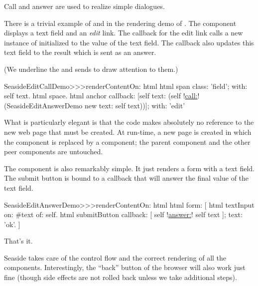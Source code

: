 \documentclass[a4paper,10pt,twoside]{book}
\begin{document}
Call and answer are used to realize simple dialogues.

There is a trivial example of  and  in the rendering demo of .
The component  displays a text field and an \emph{edit} link.
The callback for the edit link calls a new instance of  initialized to the value of the text field.
The callback also updates this text field to the result which is sent as an answer.

(We underline the  and  sends to draw attention to them.)

\begin{code}{}
SeasideEditCallDemo>>>renderContentOn: html 
	html span
		class: 'field';
		with: self text.
	html space.
	html anchor
		callback: [self text: (self !\underline{call:}! (SeasideEditAnswerDemo new text: self text))];
		with: 'edit'
\end{code}{}

What is particularly elegant is that the code makes absolutely no reference to the new web page that must be created.
At run-time, a new page is created in which the  component is replaced by a  component; the parent component and the other peer components are untouched.


The  component is also remarkably simple.
It just renders a form with a text field.
The submit button is bound to a callback that will answer the final value of the text field.

\begin{code}{}
SeasideEditAnswerDemo>>>renderContentOn: html
	html form: [
		html textInput
			on: #text of: self.
		html submitButton
			callback: [ self !\underline{answer:}! self text ];
			text: 'ok'.
		]
\end{code}{}

That's it.

Seaside takes care of the control flow and the correct rendering of all the components.
Interestingly, the ``back'' button of the browser will also work just fine (though side effects are not rolled back unless we take additional steps).

\end{document}

